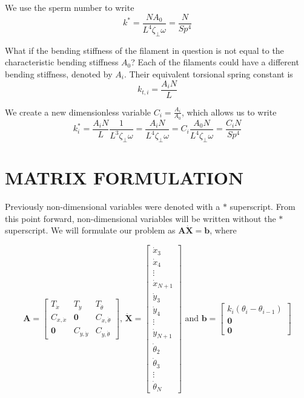 \documentclass[12pt,letterpaper,titlepage]{article}
\begin{document}
We use the sperm number to write
\begin{equation}
k^* = \frac{NA_0}{L^4 \zeta_{\bot} \omega} = \frac{N}{Sp^4}
\end{equation}

What if the bending stiffness of the filament in question is not equal to the characteristic bending stiffness $A_0$? Each of the filaments could have a different bending stiffness, denoted by $A_i$. Their equivalent torsional spring constant is
\begin{equation}
k_{t,i} = \frac{A_i N}{L}
\end{equation}

We create a new dimensionless variable $C_i = \frac{A_i}{A_0}$, which allows us to write
\begin{equation}
k_i^* = \frac{A_i N}{L} \frac{1}{L^3 \zeta_{\bot} \omega} = \frac{A_i N}{L^4 \zeta_{\bot} \omega} = C_i \frac{A_0 N}{L^4 \zeta_{\bot} \omega} = \frac{C_i N}{Sp^4}
\end{equation}

\newpage
\section{MATRIX FORMULATION}
Previously non-dimensional variables were denoted with a $*$ superscript. From this point forward, non-dimensional variables will be written without the $*$ superscript. We will formulate our problem as $\mathbf{A} \mathbf{\dot{X}} = \mathbf{b}$, where

\[\mathbf{A} = \begin{bmatrix}
T_{\dot{x}}&T_{\dot{y}}&T_{\dot{\theta}}\\
C_{x,\dot{x}}&\mathbf{0}&C_{x,\dot{\theta}}\\
\mathbf{0}&C_{y,\dot{y}}&C_{y,\dot{\theta}}
\end{bmatrix}
\text{, }
\mathbf{\dot{X}} = \begin{bmatrix}
\dot{x}_3\\
\dot{x}_4\\
\vdots \\
\dot{x}_{N+1}\\
\dot{y}_3\\
\dot{y}_4\\
\vdots \\
\dot{y}_{N+1}\\
\dot{\theta}_2\\
\dot{\theta}_3\\
\vdots \\
\dot{\theta}_N
\end{bmatrix}
\text{ and }
\mathbf{b} = \begin{bmatrix}
k_i (\theta_i - \theta_{i-1})\\
\mathbf{0}\\
\mathbf{0}
\end{bmatrix}
\]
\end{document}
